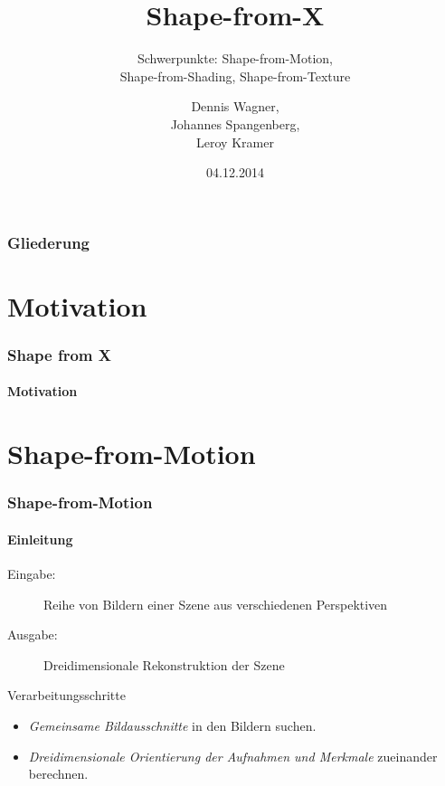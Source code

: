 \documentclass{beamer}
\title{Shape-from-X}
\subtitle{Schwerpunkte: Shape-from-Motion, \\ Shape-from-Shading, Shape-from-Texture}
\author{Dennis Wagner, \\ Johannes Spangenberg, \\ Leroy Kramer}
\date{04.12.2014}
\begin{document}
\begin{acronym}[SIFT]
\end{acronym}


\frame{\titlepage} 


\begin{frame}
	\frametitle{Gliederung}
	\tableofcontents
\end{frame} 


\section{Motivation} 
\begin{frame}
	\frametitle{Shape from X}
	\framesubtitle{Motivation}
\end{frame}


\section{Shape-from-Motion}
\begin{frame}
	\frametitle{Shape-from-Motion}
	\framesubtitle{Einleitung}

	\begin{description}
		\item[Eingabe:] Reihe von Bildern einer Szene aus verschiedenen Perspektiven
		\item[Ausgabe:] Dreidimensionale Rekonstruktion der Szene
	\end{description}

	\begin{block}{Verarbeitungsschritte}
		\begin{itemize}
			\item \emph{Gemeinsame Bildausschnitte} in den Bildern suchen.
			\item \emph{Dreidimensionale Orientierung der Aufnahmen und Merkmale} zueinander berechnen.
		\end{itemize}
	\end{block}
\end{frame}
\end{document}
